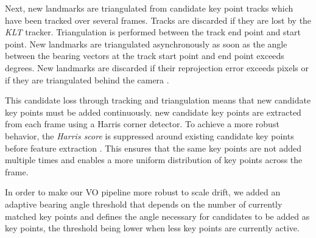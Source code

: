 Next, new landmarks are triangulated from candidate key point tracks which have been tracked over several frames. 
Tracks are discarded if they are lost by the \emph{KLT} tracker.
Triangulation is performed between the track end point and start point. 
New landmarks are triangulated asynchronously as soon as the angle between the bearing vectors at the track start point and end point exceeds \triangulationAngleThreshold degrees. 
New landmarks are discarded if their reprojection error exceeds \triangulationMaxReprError pixels or if they are triangulated behind the camera . \par 
This candidate loss through tracking and triangulation means that new candidate key points must be added continuously. 
\addCandidateEachFrame new candidate key points are extracted from each frame using a Harris corner detector. 
To achieve a more robust behavior, the \emph{Harris score} is suppressed around existing candidate key points before feature extraction . This ensures that the same key points are not added multiple times and enables a more uniform distribution of key points across the frame. \par
In order to make our VO pipeline more robust to scale drift, we added an adaptive bearing angle threshold that depends on the number of currently matched key points and defines the angle necessary for candidates to be added as key points, the threshold being lower when less key points are currently active.